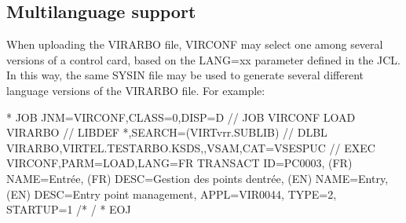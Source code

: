 \documentclass[letterpaper,10pt,english]{sphinxmanual}
\begin{document}
\ignorespaces 

\subsection{Multi\sphinxhyphen{}language support}
\label{\detokenize{Installation_Guide:multi-language-support}}\label{\detokenize{Installation_Guide:index-160}}
\sphinxAtStartPar
When uploading the VIRARBO file, VIRCONF may select one among several versions of a control card, based on the LANG=xx parameter defined in the JCL. In this way, the same SYSIN file may be used to generate several different language versions of the VIRARBO file. For example:

\begin{sphinxVerbatim}[commandchars=\\\{\}]
* \PYGZdl{}\PYGZdl{} JOB JNM=VIRCONF,CLASS=0,DISP=D
// JOB VIRCONF LOAD VIRARBO
// LIBDEF *,SEARCH=(VIRTvrr.SUBLIB)
// DLBL VIRARBO,\PYGZsq{}VIRTEL.TESTARBO.KSDS\PYGZsq{},,VSAM,CAT=VSESPUC
// EXEC VIRCONF,PARM=\PYGZsq{}LOAD,LANG=FR\PYGZsq{}
        TRANSACT ID=PC\PYGZhy{}0003, \PYGZhy{}
        (FR) NAME=\PYGZsq{}Entrée\PYGZsq{}, \PYGZhy{}
        (FR) DESC=\PYGZdq{}Gestion des points d\PYGZsq{}entrée\PYGZdq{}, \PYGZhy{}
        (EN) NAME=\PYGZsq{}Entry\PYGZsq{}, \PYGZhy{}
        (EN) DESC=\PYGZsq{}Entry point management\PYGZsq{}, \PYGZhy{}
        APPL=VIR0044, \PYGZhy{}
        TYPE=2, \PYGZhy{}
        STARTUP=1
/*
/\PYGZam{}
* \PYGZdl{}\PYGZdl{} EOJ
\end{sphinxVerbatim}

\sphinxAtStartPar
{}
\end{document}
